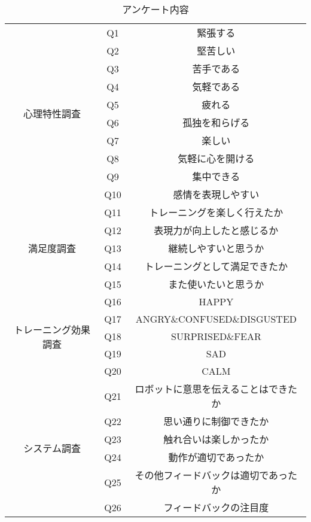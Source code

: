 \documentclass[titlepage]{jarticle}
\begin{document}
\begin{table}[h!]
\centering
\caption{アンケート内容}
\begin{tabular}{|c||cc|}
    \hline
        \multirow{10}{*}{心理特性調査} & Q1 & 緊張する\\
        & Q2 & 堅苦しい\\
        & Q3 & 苦手である\\
        & Q4 & 気軽である\\
        & Q5 & 疲れる\\
        & Q6 & 孤独を和らげる\\
        & Q7 & 楽しい\\
        & Q8 & 気軽に心を開ける\\
        & Q9 & 集中できる\\
        & Q10 & 感情を表現しやすい\\
	\hline
        \multirow{5}{*}{満足度調査} & Q11 & トレーニングを楽しく行えたか\\
        & Q12 & 表現力が向上したと感じるか\\
        & Q13 & 継続しやすいと思うか\\
        & Q14 & トレーニングとして満足できたか\\
        & Q15 & また使いたいと思うか\\
    \hline 
        \multirow{5}{*}{トレーニング効果調査} & Q16 & HAPPY \\
		& Q17 & ANGRY\&CONFUSED\&DISGUSTED\\
		& Q18 & SURPRISED\&FEAR \\
		& Q19 & SAD \\
        & Q20 & CALM \\
    
    \hline
        \multirow{6}{*}{システム調査} & Q21 & ロボットに意思を伝えることはできたか\\
        & Q22 & 思い通りに制御できたか\\
        & Q23 & 触れ合いは楽しかったか\\
        & Q24 & 動作が適切であったか\\
        & Q25 & その他フィードバックは適切であったか\\
        & Q26 & フィードバックの注目度\\
    \hline
        
\end{tabular}
\label{Question List}
\end{table}

\afterpage{\clearpage}
\newpage
\end{document}
